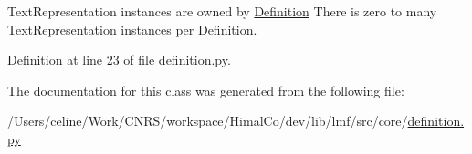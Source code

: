Text\+Representation instances are owned by \hyperlink{classlmf_1_1src_1_1core_1_1definition_1_1_definition}{Definition} There is zero to many Text\+Representation instances per \hyperlink{classlmf_1_1src_1_1core_1_1definition_1_1_definition}{Definition}. 



Definition at line 23 of file definition.\+py.



The documentation for this class was generated from the following file\+:\begin{DoxyCompactItemize}
\item 
/\+Users/celine/\+Work/\+C\+N\+R\+S/workspace/\+Himal\+Co/dev/lib/lmf/src/core/\hyperlink{definition_8py}{definition.\+py}\end{DoxyCompactItemize}
